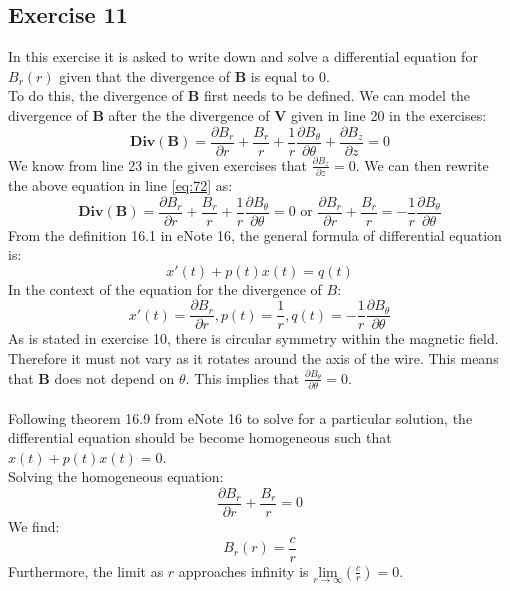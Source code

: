 \documentclass{article}
\begin{document}
\subsection{Exercise 11}
In this exercise it is asked to write down and solve a differential equation for $B_r(r)$ given that the divergence of $\mathbf{B}$ is equal to 0.
\\
To do this, the divergence of $\mathbf{B}$ first needs to be defined. We can model the divergence of $\mathbf{B}$ after the the divergence of $\mathbf{V}$ given in line 20 in the exercises:
\begin{equation} \label{eq:72}
   \mathbf{Div}(\mathbf{B})=\frac{\partial B_{r}}{\partial r}+\frac{B_{r}}{r}+\frac{1}{r}\frac{\partial B_{\theta}}{\partial \theta}+\frac{\partial B_{z}}{\partial z}=0
\end{equation}
We know from line 23 in the given exercises that $\frac{\partial B_{z}}{\partial z}=0$. We can then 
rewrite the above equation in line \ref{eq:72} as:
\begin{equation}
    \mathbf{Div}(\mathbf{B})=\frac{\partial B_{r}}{\partial r}+\frac{B_{r}}{r}+\frac{1}{r}\frac{\partial B_{\theta}}{\partial\theta}=0 \textrm{ or } \frac{\partial B_{r}}{\partial r}+\frac{B_{r}}{r}=-\frac{1}{r}\frac{\partial B_{\theta}}{\partial \theta}
\end{equation}
From the definition 16.1 in eNote 16, the general formula of differential equation is:
\begin{equation}
    x'\left(t\right)+p\left(t\right)x\left(t\right)=q\left(t\right)
\end{equation}
In the context of the equation for the divergence of $B$:
\begin{equation}
    x'\left(t\right)=\frac{\partial B_{r}}{\partial r},p\left(t\right)=\frac{1}{r},q\left(t\right)=-\frac{1}{r}\frac{\partial B_{\theta}}{\partial \theta}
\end{equation}
As is stated in exercise 10, there is circular symmetry within the magnetic field. Therefore it must not vary as it rotates around the axis of the wire. This means that $\mathbf{B}$ does not depend on  $\theta$. This implies that $\frac{\partial B_ \theta}{\partial \theta} = 0$.
\\
\\
Following theorem 16.9 from eNote 16 to solve for a particular solution, the differential equation should be become homogeneous such that $x \left(t\right)+p\left(t\right)x\left(t\right)=0$. 
\\
Solving the homogeneous equation:
\begin{equation}
    \frac{\partial B_{r}}{\partial r}+\frac{B_{r}}{r}=0
\end{equation}
We find:
\begin{equation}
    B_{r}\left(r\right)=\frac{c}{r}
\end{equation}
Furthermore, the limit as $r$ approaches infinity is $\underset{r\rightarrow\infty}{\mathrm{lim}}(\frac{c}{r})=0$.
\end{document}
